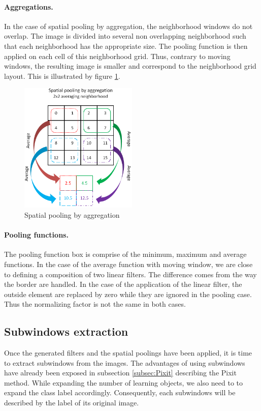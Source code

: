 \documentclass[a4paper]{report}
\begin{document}
			\paragraph{Aggregations.}
			In the case of spatial pooling by aggregation, the neighborhood windows do not overlap. The image is divided into several non overlapping neighborhood such that each neighborhood has the appropriate size. The pooling function is then applied on each cell of this neighborhood grid. Thus, contrary to moving windows, the resulting image is smaller and correspond to the neighborhood grid layout. This is illustrated by figure \ref{fig:PoolAgg}.
	\begin{figure}
		\centering
			\includegraphics[width=0.5\textwidth]{images/PoolAgg.png}
		\caption{\label{fig:PoolAgg}Spatial pooling by aggregation}
	\end{figure}
	
			\paragraph{Pooling functions.}
			The pooling function box is comprise of the minimum, maximum and average functions. In the case of the average function with moving window, we are close to defining a composition of two linear filters. The difference comes from the way the border are handled. In the case of the application of the linear filter, the outside element are replaced by zero while they are ignored in the pooling case. Thus the normalizing factor is not the same in both cases.
			
		\subsection{Subwindows extraction}
		Once the generated filters and the spatial poolings have been applied, it is time to extract subwindows from the images. The advantages of using subwindows have already been exposed in subsection \ref{subsec:Pixit} describing the Pixit method.
		While expanding the number of learning objects, we also need to to expand the class label accordingly. Consequently, each subwindows will be described by the label of its original image.
		
\end{document}
